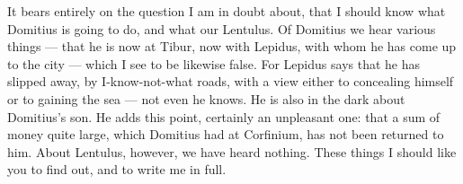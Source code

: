  It bears entirely on the question I am in doubt about, that I should know what Domitius is going to do, and what our Lentulus. Of Domitius we hear various things --- that he is now at Tibur, now with Lepidus, with whom he has come up to the city --- which I see to be likewise false. For Lepidus says that he has slipped away, by I-know-not-what roads, with a view either to concealing himself or to gaining the sea --- not even he knows. He is also in the dark about Domitius's son. He adds this point, certainly an unpleasant one: that a sum of money quite large, which Domitius had at Corfinium, has not been returned to him. About Lentulus, however, we have heard nothing. These things I should like you to find out, and to write me in full.
